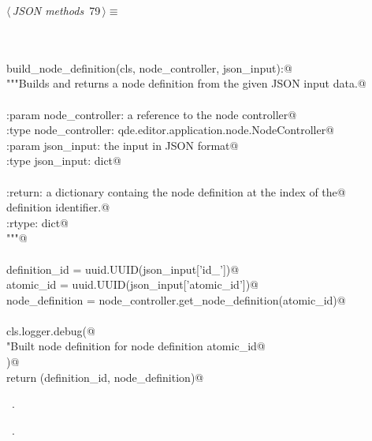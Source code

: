 \documentclass[
    a4paper,      %
    10pt,         %
    openright,    %
    notitlepage,  %
    parskip=half, %
]{scrreprt}       %
\theoremstyle{definition}                    %
\begin{document}
\begin{flushleft} \small
\begin{minipage}{\linewidth}\label{scrap130}\raggedright\small
{} $\langle\,${\itshape JSON methods}\nobreak\ {\footnotesize {79}}$\,\rangle\equiv$
\vspace{-1exm}
\begin{list}{}{} \item
\mbox{}\lstinline@@\\
\mbox{}\lstinline@classmethod@\\
\mbox{}\lstinline@def build_node_definition(cls, node_controller, json_input):@\\
\mbox{}\lstinline@    """Builds and returns a node definition from the given JSON input data.@\\
\mbox{}\lstinline@@\\
\mbox{}\lstinline@    :param node_controller: a reference to the node controller@\\
\mbox{}\lstinline@    :type  node_controller: qde.editor.application.node.NodeController@\\
\mbox{}\lstinline@    :param json_input: the input in JSON format@\\
\mbox{}\lstinline@    :type  json_input: dict@\\
\mbox{}\lstinline@@\\
\mbox{}\lstinline@    :return: a dictionary containg the node definition at the index of the@\\
\mbox{}\lstinline@             definition identifier.@\\
\mbox{}\lstinline@    :rtype:  dict@\\
\mbox{}\lstinline@    """@\\
\mbox{}\lstinline@@\\
\mbox{}\lstinline@    definition_id   = uuid.UUID(json_input['id_'])@\\
\mbox{}\lstinline@    atomic_id       = uuid.UUID(json_input['atomic_id'])@\\
\mbox{}\lstinline@    node_definition = node_controller.get_node_definition(atomic_id)@\\
\mbox{}\lstinline@@\\
\mbox{}\lstinline@    cls.logger.debug(@\\
\mbox{}\lstinline@        "Built node definition for node definition %s",@\\
\mbox{}\lstinline@        atomic_id@\\
\mbox{}\lstinline@    )@\\
\mbox{}\lstinline@    return (definition_id, node_definition)@\\
\mbox{}\lstinline@@{\NWsep}
\end{list}
\vspace{-1.5ex}
\footnotesize
\begin{list}{}{\setlength{\itemsep}{-\parsep}\setlength{\itemindent}{-\leftmargin}}
\item \NWtxtMacroDefBy\ .
\item \NWtxtMacroRefIn\ .


\end{list}
\end{minipage}
\end{flushleft}
\end{document}
